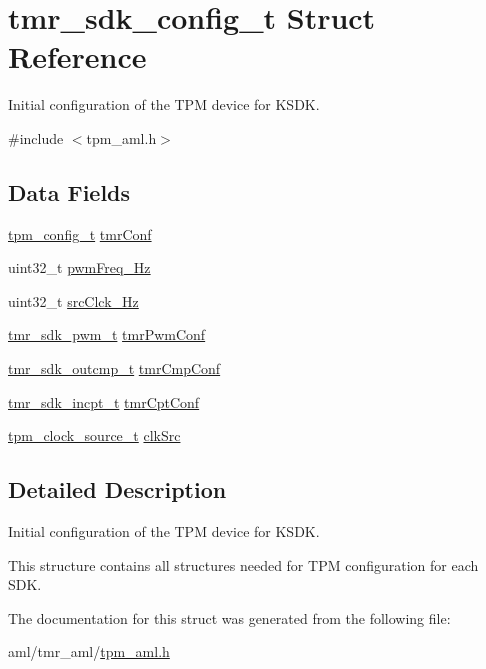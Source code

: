 \hypertarget{structtmr__sdk__config__t}{}\section{tmr\+\_\+sdk\+\_\+config\+\_\+t Struct Reference}
\label{structtmr__sdk__config__t}


Initial configuration of the T\+PM device for K\+S\+DK.  




{\ttfamily \#include $<$tpm\+\_\+aml.\+h$>$}

\subsection*{Data Fields}
\begin{DoxyCompactItemize}
\item 
\mbox{\hyperlink{group__tpm_ga5647039a18486c876df5cdeb84c9621d}{tpm\+\_\+config\+\_\+t}} \mbox{\hyperlink{group__struct__group_gae9c2d4ddfa00c67ee5c396ce0a58b3c1}{tmr\+Conf}}
\item 
uint32\+\_\+t \mbox{\hyperlink{group__struct__group_ga04fed66246fbbc2d216a8afda24a758e}{pwm\+Freq\+\_\+\+Hz}}
\item 
uint32\+\_\+t \mbox{\hyperlink{group__struct__group_ga4386243efbc69e706d1811c2e66da6fc}{src\+Clck\+\_\+\+Hz}}
\item 
\mbox{\hyperlink{structtmr__sdk__pwm__t}{tmr\+\_\+sdk\+\_\+pwm\+\_\+t}} \mbox{\hyperlink{group__struct__group_ga8f16a276a8bcee2785e8db1cb8fed1d1}{tmr\+Pwm\+Conf}}
\item 
\mbox{\hyperlink{structtmr__sdk__outcmp__t}{tmr\+\_\+sdk\+\_\+outcmp\+\_\+t}} \mbox{\hyperlink{group__struct__group_ga5f9747758e13d1d50209440d3132a87e}{tmr\+Cmp\+Conf}}
\item 
\mbox{\hyperlink{structtmr__sdk__incpt__t}{tmr\+\_\+sdk\+\_\+incpt\+\_\+t}} \mbox{\hyperlink{group__struct__group_gad49fb6a9677fd308941ceb2302f67468}{tmr\+Cpt\+Conf}}
\item 
\mbox{\hyperlink{group__tpm_gac9f0f29f5ff0e39eea892919dc9b50d8}{tpm\+\_\+clock\+\_\+source\+\_\+t}} \mbox{\hyperlink{group__struct__group_gae714239d1fabd3df000d89beb931051a}{clk\+Src}}
\end{DoxyCompactItemize}


\subsection{Detailed Description}
Initial configuration of the T\+PM device for K\+S\+DK. 

This structure contains all structures needed for T\+PM configuration for each S\+DK. 

The documentation for this struct was generated from the following file\+:\begin{DoxyCompactItemize}
\item 
aml/tmr\+\_\+aml/\mbox{\hyperlink{tpm__aml_8h}{tpm\+\_\+aml.\+h}}\end{DoxyCompactItemize}
